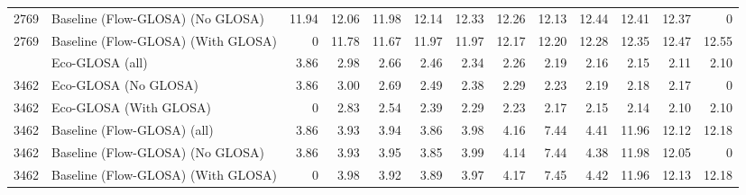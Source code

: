 \begin{table}[ht]
{\begin{tabular}{llrrrrrrrrrrr}
        2769 & Baseline (Flow-GLOSA) (No GLOSA)   & 11.94 & 12.06 & 11.98 & 12.14 & 12.33 & 12.26 & 12.13 & 12.44 & 12.41 & 12.37 & 0     \\
        2769 & Baseline (Flow-GLOSA) (With GLOSA) & 0     & 11.78 & 11.67 & 11.97 & 11.97 & 12.17 & 12.20 & 12.28 & 12.35 & 12.47 & 12.55 \\
        \addlinespace
        3462 & Eco-GLOSA (all)                    & 3.86  & 2.98  & 2.66  & 2.46  & 2.34  & 2.26  & 2.19  & 2.16  & 2.15  & 2.11  & 2.10  \\
        3462 & Eco-GLOSA (No GLOSA)               & 3.86  & 3.00  & 2.69  & 2.49  & 2.38  & 2.29  & 2.23  & 2.19  & 2.18  & 2.17  & 0     \\
        3462 & Eco-GLOSA (With GLOSA)             & 0     & 2.83  & 2.54  & 2.39  & 2.29  & 2.23  & 2.17  & 2.15  & 2.14  & 2.10  & 2.10  \\
        3462 & Baseline (Flow-GLOSA) (all)        & 3.86  & 3.93  & 3.94  & 3.86  & 3.98  & 4.16  & 7.44  & 4.41  & 11.96 & 12.12 & 12.18 \\
        3462 & Baseline (Flow-GLOSA) (No GLOSA)   & 3.86  & 3.93  & 3.95  & 3.85  & 3.99  & 4.14  & 7.44  & 4.38  & 11.98 & 12.05 & 0     \\
        3462 & Baseline (Flow-GLOSA) (With GLOSA) & 0     & 3.98  & 3.92  & 3.89  & 3.97  & 4.17  & 7.45  & 4.42  & 11.96 & 12.13 & 12.18 \\
        \bottomrule
      \end{tabular}
    }
\end{table}

